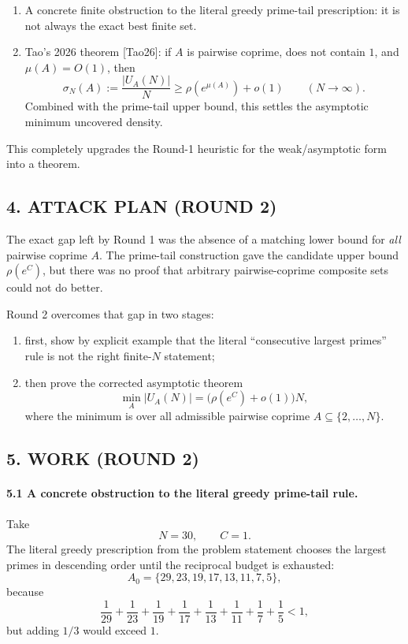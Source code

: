 \begin{enumerate}
\item A concrete finite obstruction to the literal greedy prime-tail prescription: it is not always the exact best finite set.
\item Tao's 2026 theorem [Tao26]:
if $A$ is pairwise coprime, does not contain $1$, and $\mu(A)=O(1)$, then
\[
\sigma_N(A):=\frac{|U_A(N)|}{N}\geq \rho(e^{\mu(A)})+o(1)
\qquad (N\to\infty).
\]
Combined with the prime-tail upper bound, this settles the asymptotic minimum uncovered density.
\end{enumerate}

This completely upgrades the Round-1 heuristic for the weak/asymptotic form into a theorem.

\subsection*{4. ATTACK PLAN (ROUND 2)}

The exact gap left by Round 1 was the absence of a matching lower bound for \emph{all} pairwise coprime $A$. The prime-tail construction gave the candidate upper bound $\rho(e^C)$, but there was no proof that arbitrary pairwise-coprime composite sets could not do better.

Round 2 overcomes that gap in two stages:

\begin{enumerate}
\item first, show by explicit example that the literal ``consecutive largest primes'' rule is not the right finite-$N$ statement;
\item then prove the corrected asymptotic theorem
\[
\min_A |U_A(N)| = \bigl(\rho(e^C)+o(1)\bigr)N,
\]
where the minimum is over all admissible pairwise coprime $A\subseteq\{2,\dots,N\}$.
\end{enumerate}

\subsection*{5. WORK (ROUND 2)}

\paragraph{5.1 A concrete obstruction to the literal greedy prime-tail rule.}

Take
\[
N=30,\qquad C=1.
\]
The literal greedy prescription from the problem statement chooses the largest primes in descending order until the reciprocal budget is exhausted:
\[
A_0=\{29,23,19,17,13,11,7,5\},
\]
because
\[
\frac1{29}+\frac1{23}+\frac1{19}+\frac1{17}+\frac1{13}+\frac1{11}+\frac17+\frac15<1,
\]
but adding $1/3$ would exceed $1$.

